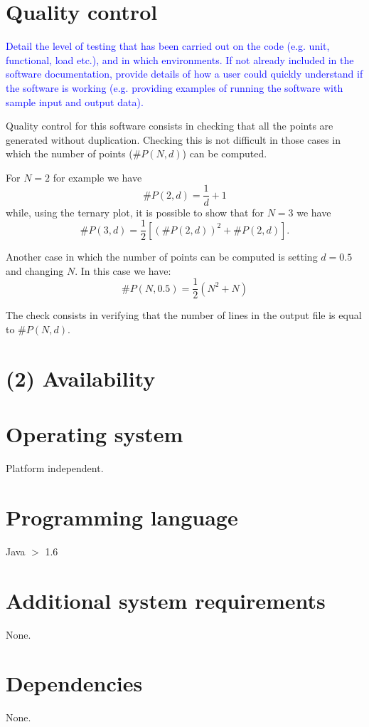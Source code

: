 \documentclass{jors}
\begin{document}
\section*{Quality control}

\textcolor{blue}{Detail the level of testing that has been carried out on the code (e.g. unit, functional, load etc.), and in which environments. If not already included in the software documentation, provide details of how a user could quickly understand if the software is working (e.g. providing examples of running the software with sample input and output data). }

Quality control for this software consists in checking that all the points are generated without duplication. Checking this is not difficult in those cases in which the number of points ($\#P(N,d)$) can be computed.

For $N=2$ for example we have
\[
	\#P(2,d)=\frac{1}{d}+1
\]
while, using the ternary plot, it is possible to show that for $N=3$ we have
\[
	\#P(3,d)=\frac{1}{2}\left[\left(\#P(2,d)\right)^2+\#P(2,d)\right].
\]

Another case in which the number of points can be computed is setting $d=0.5$ and changing $N$. In this case we have:
\[
	\#P(N,0.5)=\frac{1}{2}(N^2+N)
\]

The check consists in verifying that the number of lines in the output file is equal to $\#P(N,d)$. 


\section*{(2) Availability}
\vspace{0.5cm}
\section*{Operating system}
Platform independent.

\section*{Programming language}
Java $>$ 1.6

\section*{Additional system requirements}
None.

\section*{Dependencies}
None.
\end{document}
